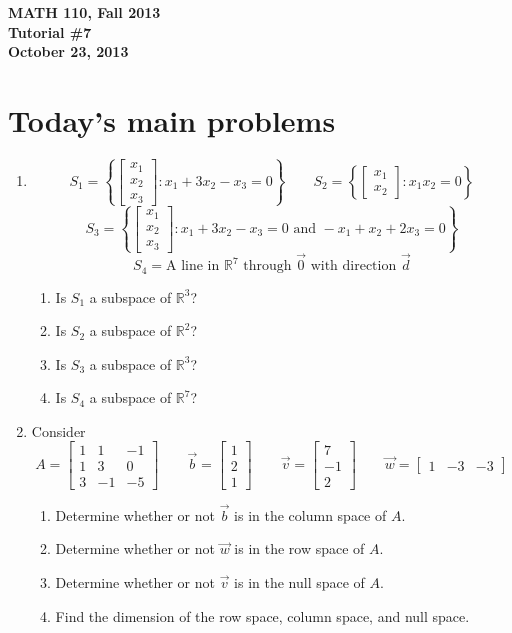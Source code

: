 \documentclass[11pt]{exam}
\newcommand{\R}{\mathbb{R}}
\newcommand{\mat}[1]{\begin{bmatrix}#1\end{bmatrix}}
\newcommand{\mthCourse}{MATH 110}
\newcommand{\mthTerm}{Fall 2013}
\newcommand{\mthTutorialNumber}{7}
\newcommand{\mthDate}{October 23, 2013}
\begin{document}
{\large
	\begin{center}
		{\bf \mthCourse, \mthTerm}\\ 
		{\bf Tutorial \#\mthTutorialNumber}\\
		{\bf \mthDate}
	\end{center}
}

\section*{Today's main problems}

\begin{enumerate}
	\item 
	\[
		S_1 = \left\{
			\mat{x_1\\x_2\\x_3}:x_1+3x_2-x_3=0
		\right\}
		\qquad
		S_2 = \left\{
			\mat{x_1\\x_2}:x_1x_2=0
		\right\}
	\]
	\[
		S_3 = \left\{
			\mat{x_1\\x_2\\x_3}:x_1+3x_2-x_3=0\text{ and }-x_1+x_2+2x_3=0
		\right\}
	\]\[
		S_4 = \text{A line in $\R^7$ through $\vec 0$ with direction $\vec d$}
	\]
	\begin{enumerate}
		\item Is $S_1$ a subspace of $\R^3$?
		\item Is $S_2$ a subspace of $\R^2$?
		\item Is $S_3$ a subspace of $\R^3$?
		\item Is $S_4$ a subspace of $\R^7$?
	\end{enumerate}
	
	\item Consider
		\[
			A=\mat{1&1&-1\\1&3&0\\3&-1&-5}\qquad \vec b=\mat{1\\2\\1}
			\qquad \vec v=\mat{7\\-1\\2}\qquad \vec w=\mat{1&-3&-3}
		\]
	\begin{enumerate}
		\item Determine whether or not $\vec b$ is in the column space of $A$.
		\item Determine whether or not $\vec w$ is in the row space of $A$.
		\item Determine whether or not $\vec v$ is in the null space of $A$.
		\item Find the dimension of the row space, column space, and null space.
	\end{enumerate}

\end{enumerate}
\end{document}
